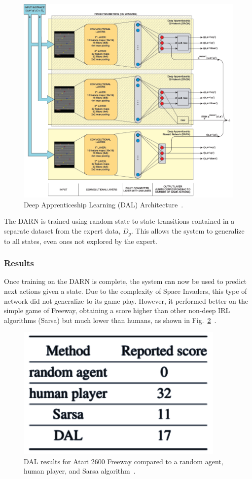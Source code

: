 \documentclass[12pt,american]{report}
\begin{document}
\begin{figure}
\centering
\includegraphics[scale=1]{images/darn-dal.png}
\caption{Deep Apprenticeship Learning (DAL) Architecture~\cite{markovikj2014deep}.}
\label{fig:darn-dal}
\end{figure}
The DARN is trained using random state to state transitions contained in a separate dataset from the expert data, $D_g$. This allows the system to generalize to all states, even ones not explored by the expert. 

\subsubsection{Results}
Once training on the DARN is complete, the system can now be used to predict next actions given a state. Due to the complexity of Space Invaders, this type of network did not generalize to its game play. However, it performed better on the simple game of Freeway, obtaining a score higher than other non-deep IRL algorithms (Sarsa) but much lower than humans, as shown in Fig.~\ref{fig:dal-results}~\cite{markovikj2014deep}. 

\begin{figure}
\centering
\includegraphics[scale=1]{images/dal-results.png}
\caption{DAL results for Atari 2600 Freeway compared to a random agent, human player, and Sarsa algorithm~\cite{markovikj2014deep}.}
\label{fig:dal-results}
\end{figure}
\end{document}
